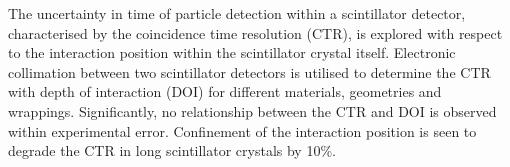 The uncertainty in time of particle detection within a scintillator detector, characterised by the coincidence time resolution (CTR), is explored with respect to the interaction position within the scintillator crystal itself. Electronic collimation between two scintillator detectors is utilised to determine the CTR with depth of interaction (DOI) for different materials, geometries and wrappings. Significantly, no relationship between the CTR and DOI is observed within experimental error. Confinement of the interaction position is seen to degrade the CTR in long scintillator crystals by 10\%.